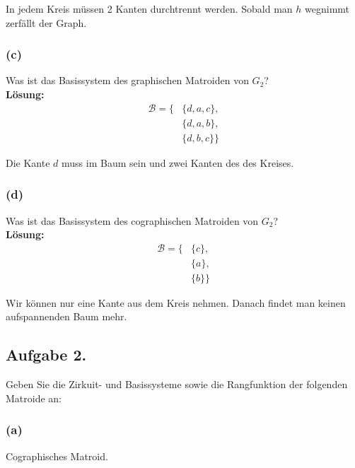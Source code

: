 \documentclass[11pt,a4paper,ngerman]{article}
\begin{document}
In jedem Kreis müssen 2 Kanten durchtrennt werden. Sobald man $h$ wegnimmt
zerfällt der Graph.

\subsubsection*{(c)}
Was ist das Basissystem des graphischen Matroiden von $G_2$?\\

\textbf{Lösung:}\\

\begin{equation*}\begin{split}
    \mathcal{B} = \{
        & \{d , a , c\}, \\
        & \{d , a , b\}, \\
        & \{d , b , c \} \}
\end{split}\end{equation*}

Die Kante $d$ muss im Baum sein und zwei Kanten des des Kreises.

\subsubsection*{(d)}
Was ist das Basissystem des cographischen Matroiden von $G_2$?\\

\textbf{Lösung:}\\

\begin{equation*}\begin{split}
    \mathcal{B} = \{
        & \{ c \},\\
        & \{ a \},\\
        & \{ b \} \}
\end{split}\end{equation*}

Wir können nur eine Kante aus dem Kreis nehmen. Danach findet man keinen aufspannenden Baum mehr.

\subsection*{Aufgabe 2.}

Geben Sie die Zirkuit- und Basissysteme sowie die Rangfunktion der folgenden Matroide an:

\subsubsection*{(a)}
Cographisches Matroid.\\
\end{document}
